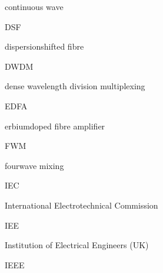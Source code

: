 \documentclass[letterpaper,10pt,english]{sphinxmanual}
\begin{document}
continuous wave









DSF





dispersion\sphinxhyphen{}shifted fibre









DWDM





dense wavelength division multiplexing









EDFA





erbium\sphinxhyphen{}doped fibre amplifier









FWM





four\sphinxhyphen{}wave mixing









IEC





International Electrotechnical Commission









IEE





Institution of Electrical Engineers (UK)









IEEE
\end{document}
